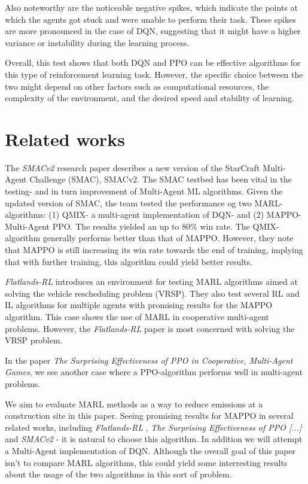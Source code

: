\documentclass[conference]{IEEEtran}
\begin{document}
	Also noteworthy are the noticeable negative spikes, which indicate the points at which the agents got
	stuck and were unable to perform their task. These spikes are more pronounced in the case of DQN,
	suggesting that it might have a higher variance or instability during the learning process.

	Overall, this test shows that both DQN and PPO can be effective algorithms for this type of reinforcement
	learning task. However, the specific choice between the two might depend on other factors such as
	computational resources, the complexity of the environment, and the desired speed and stability of
	learning.




	\section{Related works}
	The \textit{SMACv2} \cite{ellis2022smacv2} research paper describes a new version of the StarCraft Multi-Agent
	Challenge (SMAC), SMACv2. The SMAC testbed has been vital in the testing- and in turn improvement
	of Multi-Agent ML algorithms. Given the updated version of SMAC, the team tested the performance og two
	MARL- algorithms: (1) QMIX- a multi-agent implementation of DQN- and (2) MAPPO- Multi-Agent PPO. The
	results yielded an up to 80\% win rate. The QMIX-algorithm generally performs better than that of MAPPO.
	However, they note that MAPPO is still increasing its win rate towards the end of training, implying
	that with further training, this algorithm could yield better results.

	\textit{Flatlands-RL} \cite{laurent2021flatland} introduces an environment for testing MARL algorithms aimed at
	solving the vehicle rescheduling problem (VRSP). They also test several RL and IL algorithms for
	multiple agents with promising results for the MAPPO algorithm. This case shows the use of MARL in cooperative
	multi-agent problems. However, the \textit{Flatlands-RL} paper is most concerned with solving the VRSP problem.

	In the paper \textit{The Surprising Effectiveness of PPO in Cooperative, Multi-Agent Games}, \cite{yu2022surprising}
	we see another case where a PPO-algorithm performs well in multi-agent problems.

	We aim to evaluate MARL methods as a way to reduce \coo{} emissions at a construction site in this paper.
	Seeing promising results for MAPPO in several related works, including \textit{Flatlands-RL} \cite{laurent2021flatland},
	\textit{The Surprising Effectiveness of PPO [...]} \cite{yu2022surprising} and \textit{SMACv2} \cite{ellis2022smacv2}-
	it is natural to choose this algorithm. In addition we will attempt a Multi-Agent implementation of DQN. Although the
	overall goal of this paper isn't to compare MARL algorithms, this could yield some interresting results about the
	usage of the two algorithms in this sort of problem.
\end{document}
